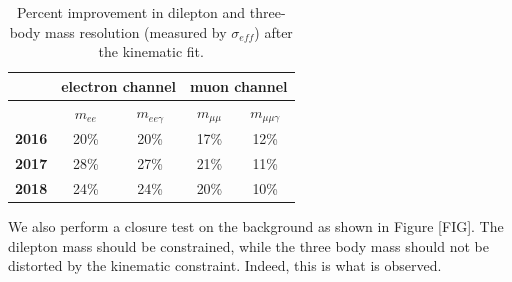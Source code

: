 \begin{table}[h]
    \begin{center}
    \caption{
        Percent improvement in dilepton and three-body mass resolution (measured by $\sigma_{eff}$) 
        after the kinematic fit.
      }
        \begin{tabular}{|c|cc|cc|}
      \hline
               & \multicolumn{2}{c|}{\textbf{electron channel}}   & \multicolumn{2}{c|}{\textbf{muon channel}}               \\
	  \hline
		&$m_{ee}$&$m_{ee\gamma}$&$m_{\mu\mu}$&$m_{\mu\mu\gamma}$\\\hline
            \textbf{2016} & 20\% & 20\%& 17\% &12\%\\ 
      \hline
            \textbf{2017} & 28\% & 27\%& 21\% &11\%\\ 
      \hline 
            \textbf{2018} & 24\% & 24\%& 20\% &10\% \\ 
      \hline 
    \end{tabular}
    \label{tab:sig_eff_refit}
    \end{center}
\end{table}

We also perform a closure test on the background as shown in Figure [FIG]. The dilepton mass should be constrained,
while the three body mass should not be distorted by the kinematic constraint. Indeed, this is what is observed.
